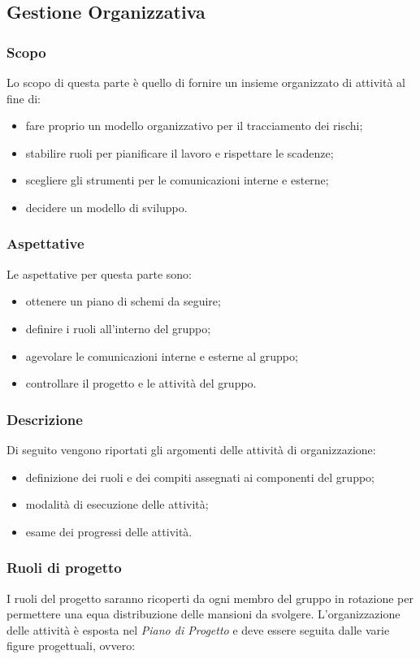 \subsection{Gestione Organizzativa}
\subsubsection{Scopo}
Lo scopo di questa parte è quello di fornire un insieme organizzato di attività al fine di:
\begin{itemize}
    \item fare proprio un modello organizzativo per il tracciamento dei rischi;
    \item stabilire ruoli per pianificare il lavoro e rispettare le scadenze;
    \item scegliere gli strumenti per le comunicazioni interne e esterne;
    \item decidere un modello di sviluppo.
\end{itemize}

\subsubsection{Aspettative}
Le aspettative per questa parte sono:
\begin{itemize}
    \item ottenere un piano di schemi da seguire;
    \item definire i ruoli all'interno del gruppo;
    \item agevolare le comunicazioni interne e esterne al gruppo;
    \item controllare il progetto e le attività del gruppo.
\end{itemize}

\subsubsection{Descrizione}
Di seguito vengono riportati gli argomenti delle attività di organizzazione:
\begin{itemize}
    \item definizione dei ruoli e dei compiti assegnati ai componenti del gruppo;
    \item modalità di esecuzione delle attività;
    \item esame dei progressi delle attività.
\end{itemize}

\subsubsection{Ruoli di progetto}
I ruoli del progetto saranno ricoperti da ogni membro del gruppo in rotazione per permettere
una equa distribuzione delle mansioni da svolgere. L'organizzazione delle attività
è esposta nel \emph{Piano di Progetto} e deve essere seguita dalle varie figure progettuali, ovvero:

